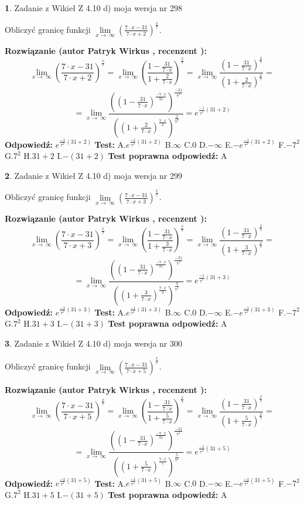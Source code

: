 \documentclass[12pt, a4paper]{article}
\theoremstyle{definition} %
\newtheorem{zad}{}
\newcommand{\zadStart}[1]{\begin{zad}#1\newline}
\newcommand{\zadStop}{\end{zad}}
\newcommand{\rozwStart}[2]{\noindent \textbf{Rozwiązanie (autor #1 , recenzent #2): }\newline}
\newcommand{\rozwStop}{\newline}
\newcommand{\odpStart}{\noindent \textbf{Odpowiedź:}\newline}
\newcommand{\odpStop}{\newline}
\newcommand{\testStart}{\noindent \textbf{Test:}\newline}
\newcommand{\testStop}{\newline}
\newcommand{\kluczStart}{\noindent \textbf{Test poprawna odpowiedź:}\newline}
\newcommand{\kluczStop}{\newline}
\begin{document}
\zadStart{Zadanie z Wikieł Z 4.10 d) moja wersja nr 298}


Obliczyć granicę funkcji  $\lim\limits_{x\to\ \infty}(\frac{7\cdot x-31}{7\cdot x+2})^{\frac{x}{7}}$.
\zadStop
\rozwStart{Patryk Wirkus}{}
$$\lim\limits_{x\to\ \infty}(\frac{7\cdot x-31}{7\cdot x+2})^{\frac{x}{7}} = \lim\limits_{x\to\ \infty}(\frac{1-\frac{31}{7\cdot x}}{1+\frac{2}{7\cdot x}})^{\frac{x}{7}}=\lim\limits_{x\to\ \infty}\frac{(1-\frac{31}{7\cdot x})^{\frac{x}{7}}}{(1+\frac{2}{7\cdot x})^{\frac{x}{7}}}=$$
$$=\lim\limits_{x\to\ \infty}\frac{((1-\frac{31}{7\cdot x})^{\frac{-7\cdot x}{31}})^{\frac{-31}{7^{2}}}}{((1+\frac{2}{7\cdot x})^{\frac{7\cdot x}{2}})^{\frac{2}{7^{2}}}}=e^{\frac{-1}{7^{2}}(31+2)}$$
\rozwStop
\odpStart
$e^{\frac{-1}{7^{2}}(31+2)}$
\odpStop
\testStart
A.$e^{\frac{-1}{7^{2}}(31+2)}$ B.$\infty$ C.$0$ D.$-\infty$ E.$-e^{\frac{-1}{7^{2}}(31+2)}$
F.$-7^{2}$ G.$7^{2}$
H.$31+2$
I.$-(31+2)$
\testStop
\kluczStart
A
\kluczStop



\zadStart{Zadanie z Wikieł Z 4.10 d) moja wersja nr 299}


Obliczyć granicę funkcji  $\lim\limits_{x\to\ \infty}(\frac{7\cdot x-31}{7\cdot x+3})^{\frac{x}{7}}$.
\zadStop
\rozwStart{Patryk Wirkus}{}
$$\lim\limits_{x\to\ \infty}(\frac{7\cdot x-31}{7\cdot x+3})^{\frac{x}{7}} = \lim\limits_{x\to\ \infty}(\frac{1-\frac{31}{7\cdot x}}{1+\frac{3}{7\cdot x}})^{\frac{x}{7}}=\lim\limits_{x\to\ \infty}\frac{(1-\frac{31}{7\cdot x})^{\frac{x}{7}}}{(1+\frac{3}{7\cdot x})^{\frac{x}{7}}}=$$
$$=\lim\limits_{x\to\ \infty}\frac{((1-\frac{31}{7\cdot x})^{\frac{-7\cdot x}{31}})^{\frac{-31}{7^{2}}}}{((1+\frac{3}{7\cdot x})^{\frac{7\cdot x}{3}})^{\frac{3}{7^{2}}}}=e^{\frac{-1}{7^{2}}(31+3)}$$
\rozwStop
\odpStart
$e^{\frac{-1}{7^{2}}(31+3)}$
\odpStop
\testStart
A.$e^{\frac{-1}{7^{2}}(31+3)}$ B.$\infty$ C.$0$ D.$-\infty$ E.$-e^{\frac{-1}{7^{2}}(31+3)}$
F.$-7^{2}$ G.$7^{2}$
H.$31+3$
I.$-(31+3)$
\testStop
\kluczStart
A
\kluczStop



\zadStart{Zadanie z Wikieł Z 4.10 d) moja wersja nr 300}


Obliczyć granicę funkcji  $\lim\limits_{x\to\ \infty}(\frac{7\cdot x-31}{7\cdot x+5})^{\frac{x}{7}}$.
\zadStop
\rozwStart{Patryk Wirkus}{}
$$\lim\limits_{x\to\ \infty}(\frac{7\cdot x-31}{7\cdot x+5})^{\frac{x}{7}} = \lim\limits_{x\to\ \infty}(\frac{1-\frac{31}{7\cdot x}}{1+\frac{5}{7\cdot x}})^{\frac{x}{7}}=\lim\limits_{x\to\ \infty}\frac{(1-\frac{31}{7\cdot x})^{\frac{x}{7}}}{(1+\frac{5}{7\cdot x})^{\frac{x}{7}}}=$$
$$=\lim\limits_{x\to\ \infty}\frac{((1-\frac{31}{7\cdot x})^{\frac{-7\cdot x}{31}})^{\frac{-31}{7^{2}}}}{((1+\frac{5}{7\cdot x})^{\frac{7\cdot x}{5}})^{\frac{5}{7^{2}}}}=e^{\frac{-1}{7^{2}}(31+5)}$$
\rozwStop
\odpStart
$e^{\frac{-1}{7^{2}}(31+5)}$
\odpStop
\testStart
A.$e^{\frac{-1}{7^{2}}(31+5)}$ B.$\infty$ C.$0$ D.$-\infty$ E.$-e^{\frac{-1}{7^{2}}(31+5)}$
F.$-7^{2}$ G.$7^{2}$
H.$31+5$
I.$-(31+5)$
\testStop
\kluczStart
A
\kluczStop
\end{document}
